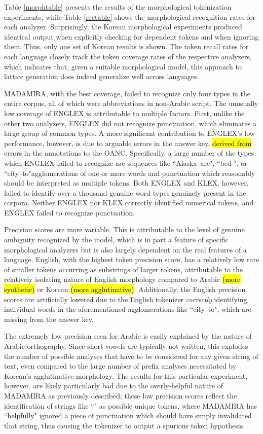 Table \ref{morphtable} presents the results of the morphological tokenization experiments, while Table \ref{rectable} shows the morphological recognition rates for each analyzer. Surprisingly, the Korean morphological experiments produced identical output when explicitly checking for dependent tokens and when ignoring them. Thus, only one set of Korean results is shown. The token recall rates for each language closely track the token coverage rates of the respective analyzers, which indicates that, given a suitable morphological model, this approach to lattice generation does indeed generalize well across languages.

MADAMIRA, with the best coverage, failed to recognize only four types in the entire corpus, all of which were abbreviations in non-Arabic script. The unusually low coverage of ENGLEX is attributable to multiple factors. First, unlike the other two analyzers, ENGLEX did not recognize punctuation, which eliminates a large group of common types. A more significant contribution to ENGLEX's low performance, however, is due to arguable errors in the answer key, \hl{derived from} errors in the annotations to the OANC. Specifically, a large number of the types which ENGLEX failed to recognize are sequences like ``Alaska--are", ``bed-", or ``city--to"\textemdash agglomerations of one or more words and punctuation which reasonably should be interpreted as multiple tokens. Both ENGLEX and KLEX, however, failed to identify over a thousand genuine word types genuinely present in the corpora. Neither ENGLEX nor KLEX correctly identified numerical tokens, and ENGLEX failed to recognize punctuation.

Precision scores are more variable. This is attributable to the level of genuine ambiguity recognized by the model, which is in part a feature of specific morphological analyzers but is also largely dependent on the real features of a language. English, with the highest token precision score, has a relatively low rate of smaller tokens occurring as substrings of larger tokens, attributable to the relatively isolating nature of English morphology compared to Arabic \hl{(more synthetic)} or Korean \hl{(more agglutinative)}. Additionally, the English precision scores are artificially lowered due to the English tokenizer \textit{correctly} identifying individual words in the aforementioned agglomerations like ``city--to", which are missing from the answer key.

The extremely low precision seen for Arabic is easily explained by the nature of Arabic orthography. Since short vowels are typically not written, this explodes the number of possible analyses that have to be considered for any given string of text, even compared to the large number of prefix analyses necessitated by Korean's agglutinative morphology. The results for this particular experiment, however, are likely particularly bad due to the overly-helpful nature of MADAMIRA as previously described; these low precision scores reflect the identification of strings like \novocalize``" as possible unique tokens, where MADAMIRA has ``helpfully" ignored a piece of punctuation which should have simply invalidated that string, thus causing the tokenizer to output a spurious token hypothesis.

